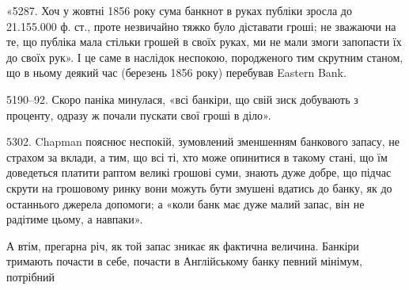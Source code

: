 «5287. Хоч у жовтні 1856 року сума банкнот в руках публіки зросла
до \num{21.155.000} ф. ст., проте незвичайно тяжко було діставати гроші; не зважаючи
на те, що публіка мала стільки грошей в своїх руках, ми не мали змоги запопасти
їх до своїх рук». І це саме в наслідок неспокою, породженого тим
скрутним станом, що в ньому деякий час (березень 1856 року) перебував
Eastern Bank.

5190--92. Скоро паніка минулася, «всі банкіри, що свій зиск добувають
з проценту, одразу ж почали пускати свої гроші в діло».

5302. Chapman пояснює неспокій, зумовлений зменшенням банкового
запасу, не страхом за вклади, а тим, що всі ті, хто може опинитися в такому
стані, що їм доведеться платити раптом великі грошові суми, знають дуже добре,
що підчас скрути на грошовому ринку вони можуть бути змушені вдатись до
банку, як до останнього джерела допомоги; а «коли банк має дуже малий запас,
він не радітиме цьому, а навпаки».

А втім, прегарна річ, як той запас зникає як фактична величина. Банкіри
тримають почасти в себе, почасти в Англійському банку певний мінімум, потрібний
\parbreak{}  %
